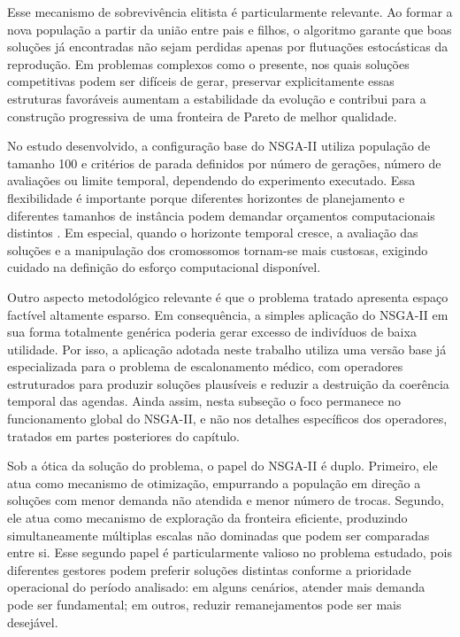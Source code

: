 Esse mecanismo de sobrevivência elitista é particularmente relevante. Ao formar a nova população a partir da união entre pais e filhos, o algoritmo garante que boas soluções já encontradas não sejam perdidas apenas por flutuações estocásticas da reprodução. Em problemas complexos como o presente, nos quais soluções competitivas podem ser difíceis de gerar, preservar explicitamente essas estruturas favoráveis aumentam a estabilidade da evolução e contribui para a construção progressiva de uma fronteira de Pareto de melhor qualidade.

No estudo desenvolvido, a configuração base do NSGA-II utiliza população de tamanho 100 e critérios de parada definidos por número de gerações, número de avaliações ou limite temporal, dependendo do experimento executado. Essa flexibilidade é importante porque diferentes horizontes de planejamento e diferentes tamanhos de instância podem demandar orçamentos computacionais distintos \cite{Lavygina_Welsh_Crispin_2019,Khalili_Shahrezaei_Abri_2020}. Em especial, quando o horizonte temporal cresce, a avaliação das soluções e a manipulação dos cromossomos tornam-se mais custosas, exigindo cuidado na definição do esforço computacional disponível.

Outro aspecto metodológico relevante é que o problema tratado apresenta espaço factível altamente esparso. Em consequência, a simples aplicação do NSGA-II em sua forma totalmente genérica poderia gerar excesso de indivíduos de baixa utilidade. Por isso, a aplicação adotada neste trabalho utiliza uma versão base já especializada para o problema de escalonamento médico, com operadores estruturados para produzir soluções plausíveis e reduzir a destruição da coerência temporal das agendas. Ainda assim, nesta subseção o foco permanece no funcionamento global do NSGA-II, e não nos detalhes específicos dos operadores, tratados em partes posteriores do capítulo.

Sob a ótica da solução do problema, o papel do NSGA-II é duplo. Primeiro, ele atua como mecanismo de otimização, empurrando a população em direção a soluções com menor demanda não atendida e menor número de trocas. Segundo, ele atua como mecanismo de exploração da fronteira eficiente, produzindo simultaneamente múltiplas escalas não dominadas que podem ser comparadas entre si. Esse segundo papel é particularmente valioso no problema estudado, pois diferentes gestores podem preferir soluções distintas conforme a prioridade operacional do período analisado: em alguns cenários, atender mais demanda pode ser fundamental; em outros, reduzir remanejamentos pode ser mais desejável.

